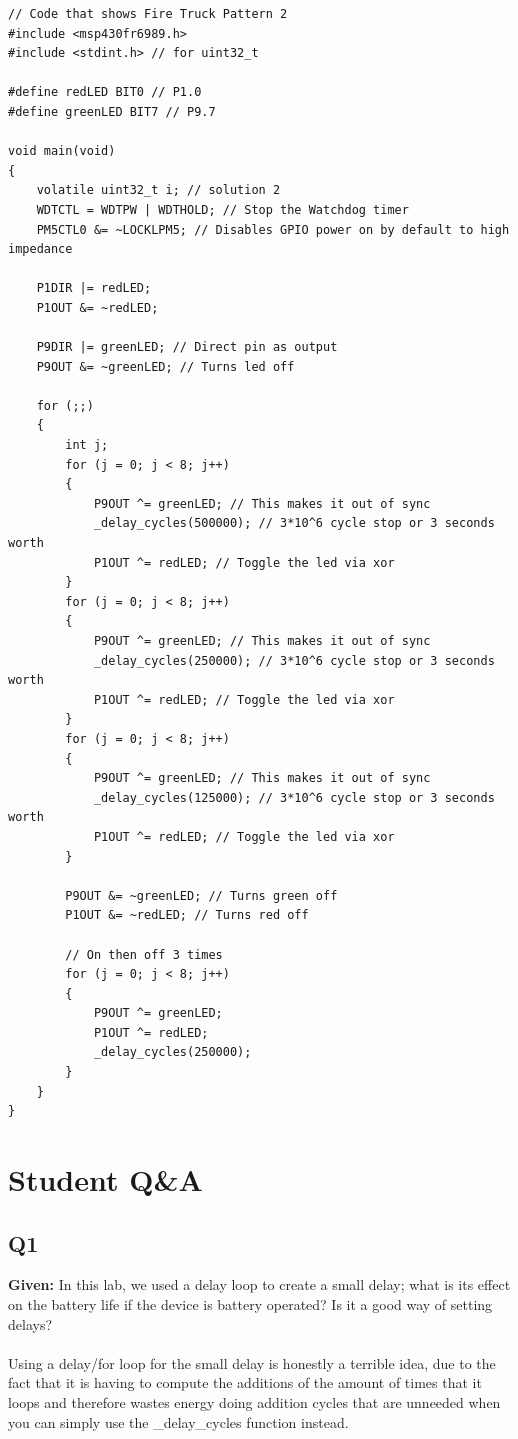 \documentclass{article}
\begin{document}
\begin{lstlisting}
// Code that shows Fire Truck Pattern 2
#include <msp430fr6989.h>
#include <stdint.h> // for uint32_t

#define redLED BIT0 // P1.0
#define greenLED BIT7 // P9.7

void main(void)
{
    volatile uint32_t i; // solution 2
    WDTCTL = WDTPW | WDTHOLD; // Stop the Watchdog timer
    PM5CTL0 &= ~LOCKLPM5; // Disables GPIO power on by default to high impedance

    P1DIR |= redLED;
    P1OUT &= ~redLED;

    P9DIR |= greenLED; // Direct pin as output
    P9OUT &= ~greenLED; // Turns led off

    for (;;)
    {
        int j;
        for (j = 0; j < 8; j++)
        {
            P9OUT ^= greenLED; // This makes it out of sync
            _delay_cycles(500000); // 3*10^6 cycle stop or 3 seconds worth
            P1OUT ^= redLED; // Toggle the led via xor
        }
        for (j = 0; j < 8; j++)
        {
            P9OUT ^= greenLED; // This makes it out of sync
            _delay_cycles(250000); // 3*10^6 cycle stop or 3 seconds worth
            P1OUT ^= redLED; // Toggle the led via xor
        }
        for (j = 0; j < 8; j++)
        {
            P9OUT ^= greenLED; // This makes it out of sync
            _delay_cycles(125000); // 3*10^6 cycle stop or 3 seconds worth
            P1OUT ^= redLED; // Toggle the led via xor
        }

        P9OUT &= ~greenLED; // Turns green off
        P1OUT &= ~redLED; // Turns red off

        // On then off 3 times
        for (j = 0; j < 8; j++)
        {
            P9OUT ^= greenLED;
            P1OUT ^= redLED;
            _delay_cycles(250000);
        }
    }
}
\end{lstlisting}

\section{Student Q\&A}
\subsection{Q1}
\textbf{Given: } In this lab, we used a delay loop to create a small delay; what is its effect on the battery life if the device is battery operated? Is it a good way of setting delays?
\\
\\
Using a delay/for loop for the small delay is honestly a terrible idea, due to the fact that it is having to compute the additions of the amount of times that it loops and therefore wastes energy doing addition cycles that are unneeded when you can simply use the \_delay\_cycles function instead.
\end{document}
